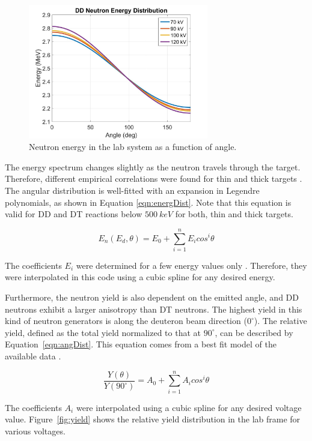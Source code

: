 \documentclass[review]{elsarticle}
\begin{document}
\begin{figure}
	\centering
	\includegraphics[width=0.7\textwidth]{pics/energy_dist}
	\caption{Neutron energy in the lab system as a function of angle.}
	\label{fig:energy_dist}
\end{figure}

The energy spectrum changes slightly as the neutron travels through the target. Therefore, different empirical correlations were found for thin and thick targets \cite{CRC}. The angular distribution is well-fitted with an expansion in Legendre polynomials, as shown in Equation \ref{eqn:energDist}. Note that this equation is valid for DD and DT reactions below $500\ keV$ for both, thin and thick targets. 

\begin{equation}
E_n(E_d,\theta)=E_0+\sum_{i=1}^{n}E_i cos^i \theta
\label{eqn:energDist}
\end{equation}

The coefficients $E_i$ were determined for a few energy values only \cite{CRC}. Therefore, they were interpolated in this code using a cubic spline for any desired energy.

Furthermore, the neutron yield is also dependent on the emitted angle, and DD neutrons exhibit a larger anisotropy than DT neutrons. The highest yield in this kind of neutron generators is along the deuteron beam direction ($0^\circ$). The relative yield, defined as the total yield normalized to that at $90^{\circ}$, can be described by Equation~\ref{eqn:angDist}. This equation comes from a best fit model of the available data \cite{CRC}.

\begin{equation}
\frac{Y(\theta)}{Y(90^{\circ})}=A_0+\sum_{i=1}^{n}A_i cos^i \theta
\label{eqn:angDist}
\end{equation}

The coefficients $A_i$ were interpolated using a cubic spline for any desired voltage value. Figure~\ref{fig:yield} shows the relative yield distribution in the lab frame for various voltages.
\end{document}
